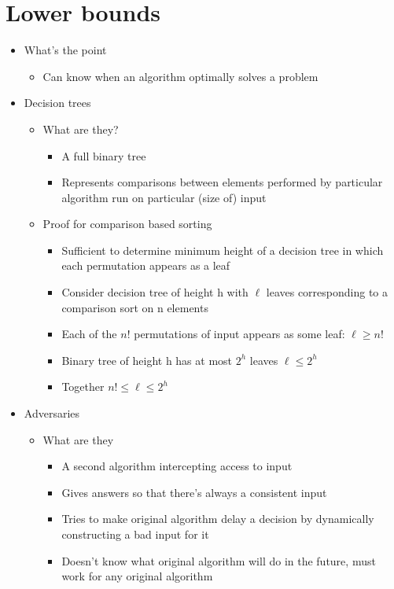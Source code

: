 \documentclass{article}[18pt]
\begin{document}
\section{Lower bounds}
\begin{itemize}
	\item What's the point
	\begin{itemize}
		\item Can know when an algorithm optimally solves a problem
	\end{itemize}
	\item Decision trees
	\begin{itemize}
		\item What are they?
		\begin{itemize}
			\item A full binary tree 
			\item Represents comparisons between elements performed by particular algorithm run on particular (size of) input
		\end{itemize}
		\item Proof for comparison based sorting
		\begin{itemize}
			\item Sufficient to determine minimum height of a decision tree in which each permutation appears as a leaf
			\item Consider decision tree of height h with $\ell$ leaves corresponding to a comparison sort on n elements
			\item Each of the $n!$ permutations of input appears as some leaf: $\ell\geqslant n!$
			\item Binary tree of height h has at most $2^h$ leaves $\ell\leqslant 2^h$
			\item Together $n!\leqslant \ell \leqslant 2^h$
		\end{itemize}
	\end{itemize}
	\item Adversaries
	\begin{itemize}
		\item What are they
		\begin{itemize}
			\item A second algorithm intercepting access to input
			\item Gives answers so that there's always a consistent input
			\item Tries to make original algorithm delay a decision by dynamically constructing a bad input for it
			\item Doesn't know what original algorithm will do in the future, must work for any original algorithm

\end{itemize}
\end{itemize}
\end{itemize}
\end{document}
